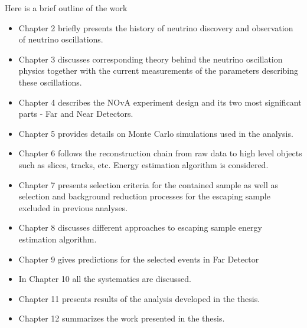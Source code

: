 Here is a brief outline of the work

\begin{itemize}

\item Chapter 2 briefly presents the history of neutrino discovery and observation 
of neutrino oscillations.

\item Chapter 3 discusses corresponding theory behind the neutrino oscillation physics
together with the current measurements of the parameters describing these oscillations.

\item Chapter 4 describes the NOvA experiment design and its two most significant parts -
Far and Near Detectors.

\item Chapter 5 provides details on Monte Carlo simulations used in the analysis.

\item Chapter 6 follows the reconstruction chain from raw data to high level objects 
such as slices, tracks, etc. Energy estimation algorithm is considered.

\item Chapter 7 presents selection criteria for the contained sample as well as selection 
and background reduction processes for the escaping sample excluded in previous analyses.

\item Chapter 8 discusses different approaches to escaping sample energy estimation 
algorithm.

\item Chapter 9 gives predictions for the selected events in Far Detector

\item In Chapter 10 all the systematics are discussed.

\item Chapter 11 presents results of the analysis developed in the
thesis.

\item Chapter 12 summarizes the work presented in the thesis.

\end{itemize}
